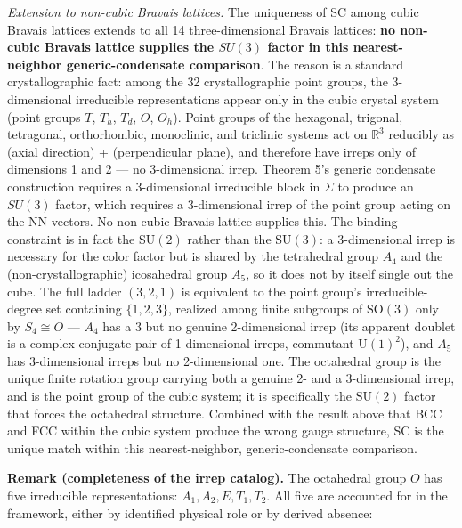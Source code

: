 \documentclass[
]{article}
\begin{document}
\emph{Extension to non-cubic Bravais lattices.} The uniqueness of SC
among cubic Bravais lattices extends to all 14 three-dimensional Bravais
lattices: \textbf{no non-cubic Bravais lattice supplies the \(SU(3)\)
factor in this nearest-neighbor generic-condensate comparison}. The
reason is a standard crystallographic fact: among the 32
crystallographic point groups, the 3-dimensional irreducible
representations appear only in the cubic crystal system (point groups
\(T\), \(T_h\), \(T_d\), \(O\), \(O_h\)). Point groups of the hexagonal,
trigonal, tetragonal, orthorhombic, monoclinic, and triclinic systems
act on \(\mathbb{R}^3\) reducibly as (axial direction) + (perpendicular
plane), and therefore have irreps only of dimensions 1 and 2 --- no
3-dimensional irrep. Theorem 5's generic condensate construction
requires a 3-dimensional irreducible block in \(\Sigma\) to produce an
\(SU(3)\) factor, which requires a 3-dimensional irrep of the point
group acting on the NN vectors. No non-cubic Bravais lattice supplies
this. The binding constraint is in fact the \(\mathrm{SU}(2)\) rather
than the \(\mathrm{SU}(3)\): a 3-dimensional irrep is necessary for the
color factor but is shared by the tetrahedral group \(A_4\) and the
(non-crystallographic) icosahedral group \(A_5\), so it does not by
itself single out the cube. The full ladder \((3,2,1)\) is equivalent to
the point group's irreducible-degree set containing \(\{1,2,3\}\),
realized among finite subgroups of \(\mathrm{SO}(3)\) only by
\(S_4 \cong O\) --- \(A_4\) has a 3 but no genuine 2-dimensional irrep
(its apparent doublet is a complex-conjugate pair of 1-dimensional
irreps, commutant \(\mathrm{U}(1)^2\)), and \(A_5\) has 3-dimensional
irreps but no 2-dimensional one. The octahedral group is the unique
finite rotation group carrying both a genuine 2- and a 3-dimensional
irrep, and is the point group of the cubic system; it is specifically
the \(\mathrm{SU}(2)\) factor that forces the octahedral structure.
Combined with the result above that BCC and FCC within the cubic system
produce the wrong gauge structure, SC is the unique match within this
nearest-neighbor, generic-condensate comparison.

\textbf{Remark (completeness of the irrep catalog).} The octahedral
group \(O\) has five irreducible representations:
\(A_1, A_2, E, T_1, T_2\). All five are accounted for in the framework,
either by identified physical role or by derived absence:
\end{document}
